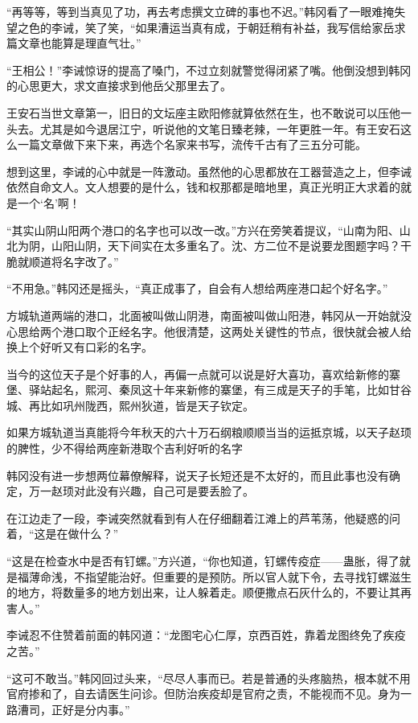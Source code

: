 “再等等，等到当真见了功，再去考虑撰文立碑的事也不迟。”韩冈看了一眼难掩失望之色的李诫，笑了笑，“如果漕运当真有成，于朝廷稍有补益，我写信给家岳求篇文章也能算是理直气壮。”

“王相公！”李诫惊讶的提高了嗓门，不过立刻就警觉得闭紧了嘴。他倒没想到韩冈的心思更大，求文直接求到他岳父那里去了。

王安石当世文章第一，旧日的文坛座主欧阳修就算依然在生，也不敢说可以压他一头去。尤其是如今退居江宁，听说他的文笔日臻老辣，一年更胜一年。有王安石这么一篇文章做下来下来，再选个名家来书写，流传千古有了三五分可能。

想到这里，李诫的心中就是一阵激动。虽然他的心思都放在工器营造之上，但李诫依然自命文人。文人想要的是什么，钱和权那都是暗地里，真正光明正大求着的就是一个‘名’啊！

“其实山阴山阳两个港口的名字也可以改一改。”方兴在旁笑着提议，“山南为阳、山北为阴，山阳山阴，天下间实在太多重名了。沈、方二位不是说要龙图题字吗？干脆就顺道将名字改了。”

“不用急。”韩冈还是摇头，“真正成事了，自会有人想给两座港口起个好名字。”

方城轨道两端的港口，北面被叫做山阴港，南面被叫做山阳港，韩冈从一开始就没心思给两个港口取个正经名字。他很清楚，这两处关键性的节点，很快就会被人给换上个好听又有口彩的名字。

当今的这位天子是个好事的人，再偏一点就可以说是好大喜功，喜欢给新修的寨堡、驿站起名，熙河、秦凤这十年来新修的寨堡，有三成是天子的手笔，比如甘谷城、再比如巩州陇西，熙州狄道，皆是天子钦定。

如果方城轨道当真能将今年秋天的六十万石纲粮顺顺当当的运抵京城，以天子赵顼的脾性，少不得给两座新港取个吉利好听的名字

韩冈没有进一步想两位幕僚解释，说天子长短还是不太好的，而且此事也没有确定，万一赵顼对此没有兴趣，自己可是要丢脸了。

在江边走了一段，李诫突然就看到有人在仔细翻着江滩上的芦苇荡，他疑惑的问着，“这是在做什么？”

“这是在检查水中是否有钉螺。”方兴道，“你也知道，钉螺传疫症——蛊胀，得了就是福薄命浅，不指望能治好。但重要的是预防。所以官人就下令，去寻找钉螺滋生的地方，将数量多的地方划出来，让人躲着走。顺便撒点石灰什么的，不要让其再害人。”

李诫忍不住赞着前面的韩冈道：“龙图宅心仁厚，京西百姓，靠着龙图终免了疾疫之苦。”

“这可不敢当。”韩冈回过头来，“尽尽人事而已。若是普通的头疼脑热，根本就不用官府掺和了，自去请医生问诊。但防治疾疫却是官府之责，不能视而不见。身为一路漕司，正好是分内事。”


